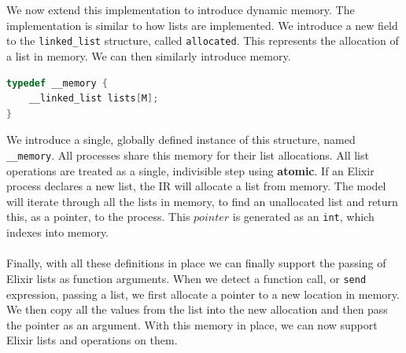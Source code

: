 \\ \\
We now extend this implementation to introduce dynamic memory. The implementation is similar to how lists are implemented. We introduce a new field to the \texttt{linked\_list} structure, called \texttt{allocated}. This represents the allocation of a list in memory. We can then similarly introduce memory.
\begin{lstlisting}[language=C, xleftmargin=.1\linewidth, caption={Memory intermediate representation. Limit of M lists.}]
typedef __memory {
    __linked_list lists[M];
}
\end{lstlisting}
We introduce a single, globally defined instance of this structure, named \texttt{\_\_memory}. All processes share this memory for their list allocations. All list operations are treated as a single, indivisible step using \textbf{atomic}. If an Elixir process declares a new list, the IR will allocate a list from memory. The model will iterate through all the lists in memory, to find an unallocated list and return this, as a pointer, to the process. This $pointer$ is generated as an \texttt{int}, which indexes into memory. 
\\ \\
Finally, with all these definitions in place we can finally support the passing of Elixir lists as function arguments. When we detect a function call, or \texttt{send} expression, passing a list, we first allocate a pointer to a new location in memory. We then copy all the values from the list into the new allocation and then pass the pointer as an argument. With this memory in place, we can now support Elixir lists and operations on them.
\\ \\
